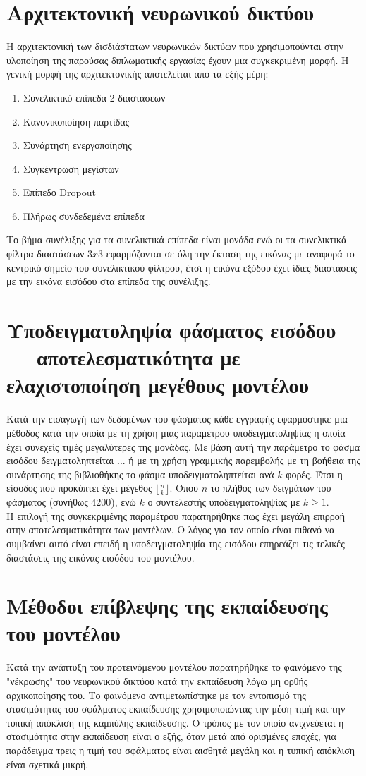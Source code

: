 \section{Αρχιτεκτονική νευρωνικού δικτύου}
Η αρχιτεκτονική των δισδιάστατων νευρωνικών δικτύων που χρησιμοπούνται στην υλοποίηση της παρούσας διπλωματικής εργασίας έχουν μια συγκεκριμένη μορφή. Η γενική μορφή της αρχιτεκτονικής αποτελείται από τα εξής μέρη:
\begin{enumerate}
    \item Συνελικτικό επίπεδα 2 διαστάσεων
    \item Κανονικοποίηση παρτίδας
    \item Συνάρτηση ενεργοποίησης
    \item Συγκέντρωση μεγίστων
    \item Επίπεδο Dropout
    \item Πλήρως συνδεδεμένα επίπεδα
\end{enumerate}
Το βήμα συνέλιξης για τα συνελικτικά επίπεδα είναι μονάδα ενώ οι τα συνελικτικά φίλτρα διαστάσεων $3x3$ εφαρμόζονται σε όλη την έκταση της εικόνας με αναφορά το κεντρικό σημείο του συνελικτικού φίλτρου, έτσι η εικόνα εξόδου έχει ίδιες διαστάσεις με την εικόνα εισόδου στα επίπεδα της συνέλιξης.

\section{Υποδειγματοληψία φάσματος εισόδου --- αποτελεσματικότητα με ελαχιστοποίηση μεγέθους μοντέλου}
Κατά την εισαγωγή των δεδομένων του φάσματος κάθε εγγραφής εφαρμόστηκε μια μέθοδος κατά την οποία με τη χρήση μιας παραμέτρου υποδειγματοληψίας  η οποία έχει συνεχείς τιμές μεγαλύτερες της μονάδας. Με βάση αυτή την παράμετρο το φάσμα εισόδου δειγματοληπτείται ... ή με τη χρήση γραμμικής παρεμβολής με τη βοήθεια της συνάρτησης  της βιβλιοθήκης  το φάσμα υποδειγματοληπτείται ανά $k$ φορές. Έτσι η είσοδος που προκύπτει έχει μέγεθος $\lfloor\frac{n}{k}\rfloor$. Όπου $n$ το πλήθος των δειγμάτων του φάσματος (συνήθως 4200), ενώ $k$ ο συντελεστής υποδειγματοληψίας με $k\ge1$.\\
Η επιλογή της συγκεκριμένης παραμέτρου παρατηρήθηκε πως έχει μεγάλη επιρροή στην αποτελεσματικότητα των μοντέλων. Ο λόγος για τον οποίο είναι πιθανό να συμβαίνει αυτό είναι επειδή η υποδειγματοληψία της εισόδου επηρεάζει τις τελικές διαστάσεις της εικόνας εισόδου του μοντέλου.

\section{Μέθοδοι επίβλεψης της εκπαίδευσης του μοντέλου}
Κατά την ανάπτυξη του προτεινόμενου μοντέλου παρατηρήθηκε το φαινόμενο της "νέκρωσης" του νευρωνικού δικτύου κατά την εκπαίδευση λόγω μη ορθής αρχικοποίησης του. Το φαινόμενο αντιμετωπίστηκε με τον εντοπισμό της στασιμότητας του σφάλματος εκπαίδευσης χρησιμοποιώντας την μέση τιμή και την τυπική απόκλιση της καμπύλης εκπαίδευσης. Ο τρόπος με τον οποίο ανιχνεύεται η στασιμότητα στην εκπαίδευση είναι ο εξής, όταν μετά από ορισμένες εποχές, για παράδειγμα τρεις η τιμή του σφάλματος είναι αισθητά μεγάλη και η τυπική απόκλιση είναι σχετικά μικρή.


